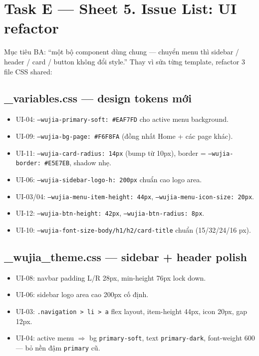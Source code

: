 \section{Task E --- Sheet 5. Issue List: UI refactor}

Mục tiêu BA: ``một bộ component dùng chung --- chuyển menu thì sidebar /
header / card / button không đổi style.'' Thay vì sửa từng template, refactor
3 file CSS shared:

\subsection{\_variables.css --- design tokens mới}

\begin{itemize}[leftmargin=*]
    \item UI-04: \texttt{--wujia-primary-soft: \#EAF7FD} cho active menu background.
    \item UI-09: \texttt{--wujia-bg-page: \#F6F8FA} (đồng nhất Home + các page khác).
    \item UI-11: \texttt{--wujia-card-radius: 14px} (bump từ 10px), border = \texttt{--wujia-border: \#E5E7EB}, shadow nhẹ.
    \item UI-06: \texttt{--wujia-sidebar-logo-h: 200px} chuẩn cao logo area.
    \item UI-03/04: \texttt{--wujia-menu-item-height: 44px}, \texttt{--wujia-menu-icon-size: 20px}.
    \item UI-12: \texttt{--wujia-btn-height: 42px}, \texttt{--wujia-btn-radius: 8px}.
    \item UI-10: \texttt{--wujia-font-size-body/h1/h2/card-title} chuẩn (15/32/24/16 px).
\end{itemize}

\subsection{\_wujia\_theme.css --- sidebar + header polish}

\begin{itemize}[leftmargin=*]
    \item UI-08: navbar padding L/R 28px, min-height 76px lock down.
    \item UI-06: sidebar logo area cao 200px cố định.
    \item UI-03: \texttt{.navigation > li > a} flex layout, item-height 44px, icon 20px, gap 12px.
    \item UI-04: active menu \(\Rightarrow\) bg \texttt{primary-soft}, text \texttt{primary-dark}, font-weight 600 --- bỏ nền đậm \texttt{primary} cũ.
\end{itemize}

